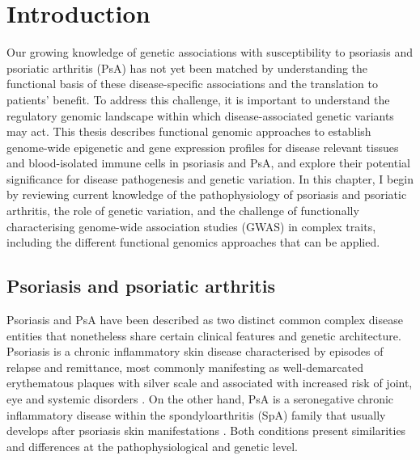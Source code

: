 \chapter{Introduction}
\label{ch:Intro}



Our growing knowledge of genetic associations with susceptibility to psoriasis and psoriatic arthritis (PsA) has not yet been matched by understanding the functional basis of these disease-specific associations and the translation to patients' benefit. To address this challenge, it is important to understand the regulatory genomic landscape within which disease-associated genetic variants may act. This thesis describes functional genomic approaches to establish genome-wide epigenetic and gene expression profiles for disease relevant tissues and blood-isolated immune cells in psoriasis and PsA, and explore their potential significance for disease pathogenesis and genetic variation. In this chapter, I begin by reviewing current knowledge of the pathophysiology of psoriasis and psoriatic arthritis, the role of genetic variation, and the challenge of functionally characterising genome-wide association studies (GWAS) in complex traits, including the different functional genomics approaches that can be applied.

\section{Psoriasis and psoriatic arthritis}
%
Psoriasis and PsA have been described as two distinct common complex disease entities that nonetheless share certain clinical features and genetic architecture. Psoriasis is a chronic inflammatory skin disease characterised by episodes of relapse and remittance, most commonly manifesting as well-demarcated erythematous plaques with silver scale and associated with increased risk of joint, eye and systemic disorders \parencite{Nestle2009}. On the other hand, PsA is a seronegative chronic inflammatory disease within the spondyloarthritis (SpA) family that usually develops after psoriasis skin manifestations \parencite{Moll1973, Coates2016, Villanova2013}. Both conditions present similarities and differences at the pathophysiological and genetic level.


